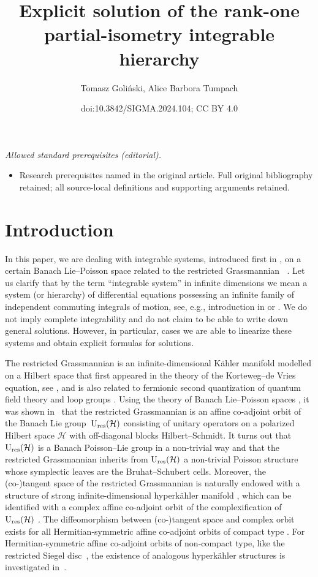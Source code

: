 \documentclass[10pt,a4paper]{amsart}
\title{Explicit solution of the rank-one partial-isometry integrable hierarchy}
\author{Tomasz Goliński, Alice Barbora Tumpach}
\date{doi:10.3842/SIGMA.2024.104; CC BY 4.0}
\theoremstyle{definition}
\numberwithin{equation}{section}
\renewcommand{\H}{\mathcal{H}}
\DeclareMathOperator{\Gr}{Gr_{res}(\H,\H_+)}
\newcommand{\Ur}{\mathrm{U}_{\textnormal{res}}(\H)}
\begin{document}
\maketitle
\noindent\textit{Allowed standard prerequisites (editorial).}\begin{itemize}
\item Research prerequisites named in the original article. Full original bibliography retained; all source-local definitions and supporting arguments retained.
\end{itemize}\medskip
\section{Introduction}

In this paper, we are dealing with integrable systems, introduced first in \cite{GO-grass}, on a certain Banach Lie--Poisson space related to the restricted Grassmannian $\Gr$. Let us clarify that by the term ``integrable system'' in infinite dimensions we mean a system (or hierarchy) of differential equations possessing an infinite family of independent commuting integrals of motion, see, e.g., introduction in \cite{hitchin-segal-ward} or \cite{bolsinov-na4}. We do not imply complete integrability and do not claim to be able to write down general solutions.
However, in particular, cases we are able to linearize these systems and obtain explicit formulas for solutions.

The restricted Grassmannian is an infinite-dimensional K\"ahler manifold modelled on a Hilbert space that first appeared in the theory of the Korteweg--de Vries equation, see \cite{sato-sato,segal-wilson}, and is also related to fermionic second quantization of quantum field theory \cite{chiumiento24,mickelsson,wurzbacher} and loop groups \cite{segal, segal-wilson}. Using the theory of Banach Lie--Poisson spaces \cite{OR, Oext}, it was shown in~\cite{Ratiu-grass} that the restricted Grassmannian is an affine co-adjoint orbit of the Banach Lie group~$\Ur$ consisting of unitary operators on a polarized Hilbert space $\mathcal{H}$ with off-diagonal blocks Hilbert--Schmidt. It turns out that $\Ur$ is a Banach Poisson--Lie group in a non-trivial way \cite{tumpach-bruhat} and that the restricted Grassmannian inherits from $\Ur$ a non-trivial Poisson structure whose symplectic leaves are the Bruhat--Schubert cells.
Moreover, the (co-)tangent space of the restricted Grassmannian is naturally endowed with a structure of strong infinite-dimensional hyperk\"ahler manifold \cite{tumpach-hyperkahler}, which can be identified with a complex affine co-adjoint orbit of the complexification of $\Ur$ \cite{tumpach-hyperkaehler2}. The diffeomorphism between (co-)tangent space and complex orbit exists for all Hermitian-symmetric affine co-adjoint orbits of compact type \cite{tumpach-hyperkaehler2,tumpach-classification}. For Hermitian-symmetric affine co-adjoint orbits of non-compact type, like the restricted Siegel disc~\cite{T-siegel}, the existence of analogous hyperk\"ahler structures is investigated in~\cite{GBRT-hyperkaehler}.
\end{document}
